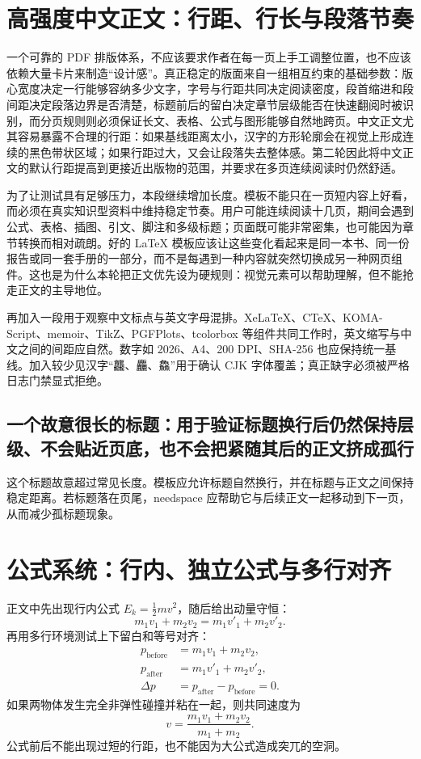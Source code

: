 \section{高强度中文正文：行距、行长与段落节奏}
\label{sec:prose}
一个可靠的 PDF 排版体系，不应该要求作者在每一页上手工调整位置，也不应该依赖大量卡片来制造“设计感”。真正稳定的版面来自一组相互约束的基础参数：版心宽度决定一行能够容纳多少文字，字号与行距共同决定阅读密度，段首缩进和段间距决定段落边界是否清楚，标题前后的留白决定章节层级能否在快速翻阅时被识别，而分页规则则必须保证长文、表格、公式与图形能够自然地跨页。中文正文尤其容易暴露不合理的行距：如果基线距离太小，汉字的方形轮廓会在视觉上形成连续的黑色带状区域；如果行距过大，又会让段落失去整体感。第二轮因此将中文正文的默认行距提高到更接近出版物的范围，并要求在多页连续阅读时仍然舒适。

为了让测试具有足够压力，本段继续增加长度。模板不能只在一页短内容上好看，而必须在真实知识型资料中维持稳定节奏。用户可能连续阅读十几页，期间会遇到公式、表格、插图、引文、脚注和多级标题；页面既可能非常密集，也可能因为章节转换而相对疏朗。好的 LaTeX 模板应该让这些变化看起来是同一本书、同一份报告或同一套手册的一部分，而不是每遇到一种内容就突然切换成另一种网页组件。这也是为什么本轮把正文优先设为硬规则：视觉元素可以帮助理解，但不能抢走正文的主导地位。

再加入一段用于观察中文标点与英文字母混排。XeLaTeX、CTeX、KOMA-Script、memoir、TikZ、PGFPlots、tcolorbox 等组件共同工作时，英文缩写与中文之间的间距应自然。数字如 2026、A4、200 DPI、SHA-256 也应保持统一基线。加入较少见汉字“龘、麤、鱻”用于确认 CJK 字体覆盖；真正缺字必须被严格日志门禁显式拒绝。


\subsection{一个故意很长的标题：用于验证标题换行后仍然保持层级、不会贴近页底，也不会把紧随其后的正文挤成孤行}
这个标题故意超过常见长度。模板应允许标题自然换行，并在标题与正文之间保持稳定距离。若标题落在页尾，needspace 应帮助它与后续正文一起移动到下一页，从而减少孤标题现象。

\section{公式系统：行内、独立公式与多行对齐}
正文中先出现行内公式 $E_k=\frac12 mv^2$，随后给出动量守恒：
\[
 m_1v_1+m_2v_2=m_1v'_1+m_2v'_2.
\]
再用多行环境测试上下留白和等号对齐：
\begin{align}
 p_{\mathrm{before}} &= m_1v_1+m_2v_2,\\
 p_{\mathrm{after}}  &= m_1v'_1+m_2v'_2,\\
 \Delta p            &= p_{\mathrm{after}}-p_{\mathrm{before}}=0.
\end{align}
如果两物体发生完全非弹性碰撞并粘在一起，则共同速度为
\[
 v=\frac{m_1v_1+m_2v_2}{m_1+m_2}.
\]
公式前后不能出现过短的行距，也不能因为大公式造成突兀的空洞。

